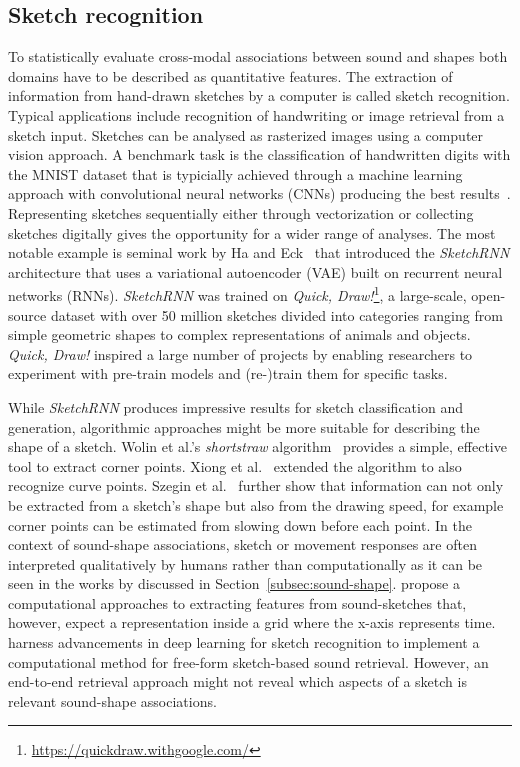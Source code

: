 \documentclass[]{interact}
\theoremstyle{plain}%
\theoremstyle{definition}
\theoremstyle{remark}
\begin{document}
\subsection{Sketch recognition}\label{subsec:sketch_recognition}
To statistically evaluate cross-modal associations between sound and shapes both domains have to be described as quantitative features. The extraction of information from hand-drawn sketches by a computer is called sketch recognition. Typical applications include recognition of handwriting or image retrieval from a sketch input. Sketches can be analysed as rasterized images using a computer vision approach. A benchmark task is the classification of handwritten digits with the MNIST dataset that is typicially achieved through a machine learning approach with convolutional neural networks (CNNs) producing the best results~\cite{lecun1998mnist, deng2012mnist}. Representing sketches sequentially either through vectorization or collecting sketches digitally gives the opportunity for a wider range of analyses. The most notable example is seminal work by Ha and Eck~\cite{haNeuralRepresentationSketch2017} that introduced the \textit{SketchRNN} architecture that uses a variational autoencoder (VAE) built on recurrent neural networks (RNNs). \textit{SketchRNN} was trained on \textit{Quick, Draw!}\footnote{\url{https://quickdraw.withgoogle.com/}}, a large-scale, open-source dataset with over 50 million sketches divided into categories ranging from simple geometric shapes to complex representations of animals and objects. \textit{Quick, Draw!} inspired a large number of projects by enabling researchers to experiment with pre-train models and (re-)train them for specific tasks. 

While \textit{SketchRNN} produces impressive results for sketch classification and generation, algorithmic approaches might be more suitable for describing the shape of a sketch. Wolin et al.'s \textit{shortstraw} algorithm~\cite{wolinShortStrawSimpleEffective} provides a simple, effective tool to extract corner points. Xiong et al.~\cite{xiongRevisitingShortStrawImproving2009} extended the algorithm to also recognize curve points. Szegin et al.~\cite{sezginFeaturePointDetection} further show that information can not only be extracted from a sketch's shape but also from the drawing speed, for example corner points can be estimated from slowing down before each point. In the context of sound-shape associations, sketch or movement responses are often interpreted qualitatively by humans rather than computationally as it can be seen in the works by  discussed in Section~\ref{subsec:sound-shape}.  propose a computational approaches to extracting features from sound-sketches that, however, expect a representation inside a grid where the x-axis represents time.  harness advancements in deep learning for sketch recognition to implement a computational method for free-form sketch-based sound retrieval. However, an end-to-end retrieval approach might not reveal which aspects of a sketch is relevant sound-shape associations.       
\end{document}
